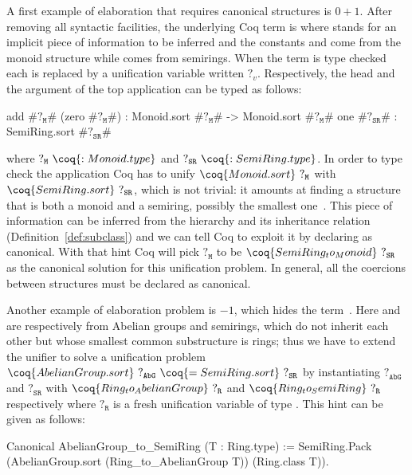 \documentclass[a4paper,UKenglish,cleveref, autoref]{lipics-v2019}
\theoremstyle{implem}
\theoremstyle{implem}
\theoremstyle{command}
\begin{document}
A first example of elaboration that requires canonical structures is \(0 + 1\).
After removing all syntactic facilities, the underlying Coq term is
 where \coq{_} stands for an implicit piece
of information to be inferred and the constants  and  come
from the monoid structure while  comes from semirings.
When the term is type checked each \coq{_} is replaced by a unification
variable written $?_v$.
Respectively, the head and the argument of the top application
can be typed as follows:
\begin{coqcode}
  add #$?_{\texttt{M}}$# (zero #$?_{\texttt{M}}$#) : Monoid.sort #$?_{\texttt{M}}$# -> Monoid.sort #$?_{\texttt{M}}$#
  one #$?_{\texttt{SR}}$# : SemiRing.sort #$?_{\texttt{SR}}$#
\end{coqcode}
where \(?_{\texttt{M}}~\coq{: Monoid.type}\) and
\(?_{\texttt{SR}}~\coq{: SemiRing.type}\).
In order to type check the application Coq has to unify \(\coq{Monoid.sort}~?_{\texttt{M}}\) with
\(\coq{SemiRing.sort}~?_{\texttt{SR}}\), which is not trivial: it amounts at
finding a structure that is both a monoid and a semiring, possibly the
smallest one~\cite[Sect.~4]{KSdraft}.
This piece of information can be inferred from the hierarchy and its inheritance
relation (Definition~\ref{def:subclass}) and we can tell Coq to exploit it by
declaring  as
canonical. With that hint Coq will pick \(?_{\texttt{M}}\) to be
\(\coq{SemiRing_to_Monoid}~?_{\texttt{SR}}\) as the canonical solution for this
unification problem.
In general, all the coercions between structures must be declared
as canonical. %

Another example of elaboration problem is \(- 1\), which hides the term~.
Here  and  are respectively from Abelian groups and semirings,
which do not inherit each other but whose smallest common substructure is
rings; thus we have to extend the unifier to solve a unification problem
\(\coq{AbelianGroup.sort}~?_{\texttt{AbG}}~\coq{= SemiRing.sort}~?_{\texttt{SR}}\) by instantiating \(?_{\texttt{AbG}}\) and \(?_{\texttt{SR}}\) with \(\coq{Ring_to_AbelianGroup}~?_{\texttt{R}}\) and \(\coq{Ring_to_SemiRing}~?_{\texttt{R}}\) respectively where \(?_{\texttt{R}}\) is a fresh unification variable of type .
This hint can be given as follows:%
\begin{coqcode}
Canonical AbelianGroup_to_SemiRing (T : Ring.type) :=
  SemiRing.Pack (AbelianGroup.sort (Ring_to_AbelianGroup T)) (Ring.class T)).
\end{coqcode}
\end{document}
